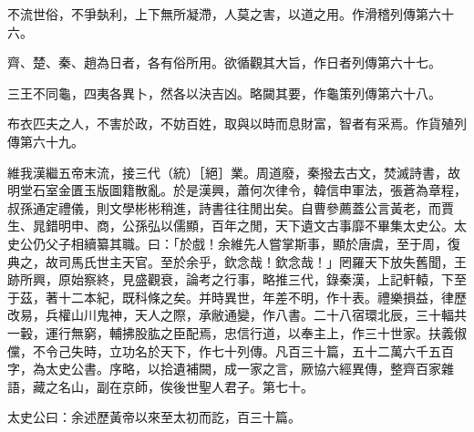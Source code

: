 \begin{pinyinscope}
不流世俗，不爭埶利，上下無所凝滯，人莫之害，以道之用。作滑稽列傳第六十六。

齊、楚、秦、趙為日者，各有俗所用。欲循觀其大旨，作日者列傳第六十七。

三王不同龜，四夷各異卜，然各以決吉凶。略闚其要，作龜策列傳第六十八。

布衣匹夫之人，不害於政，不妨百姓，取與以時而息財富，智者有采焉。作貨殖列傳第六十九。

維我漢繼五帝末流，接三代（統）［絕］業。周道廢，秦撥去古文，焚滅詩書，故明堂石室金匱玉版圖籍散亂。於是漢興，蕭何次律令，韓信申軍法，張蒼為章程，叔孫通定禮儀，則文學彬彬稍進，詩書往往閒出矣。自曹參薦蓋公言黃老，而賈生、晁錯明申、商，公孫弘以儒顯，百年之閒，天下遺文古事靡不畢集太史公。太史公仍父子相續纂其職。曰：「於戲！余維先人嘗掌斯事，顯於唐虞，至于周，復典之，故司馬氏世主天官。至於余乎，欽念哉！欽念哉！」罔羅天下放失舊聞，王跡所興，原始察終，見盛觀衰，論考之行事，略推三代，錄秦漢，上記軒轅，下至于茲，著十二本紀，既科條之矣。并時異世，年差不明，作十表。禮樂損益，律歷改易，兵權山川鬼神，天人之際，承敝通變，作八書。二十八宿環北辰，三十輻共一轂，運行無窮，輔拂股肱之臣配焉，忠信行道，以奉主上，作三十世家。扶義俶儻，不令己失時，立功名於天下，作七十列傳。凡百三十篇，五十二萬六千五百字，為太史公書。序略，以拾遺補闕，成一家之言，厥協六經異傳，整齊百家雜語，藏之名山，副在京師，俟後世聖人君子。第七十。

太史公曰：余述歷黃帝以來至太初而訖，百三十篇。


\end{pinyinscope}